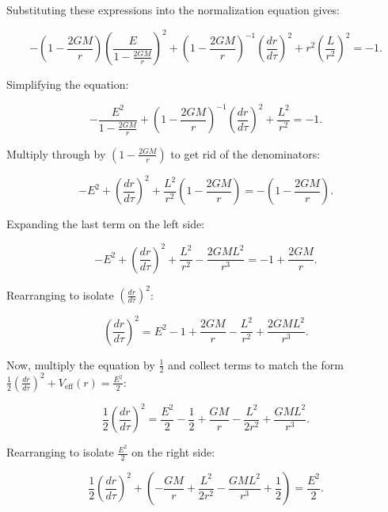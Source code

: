 \documentclass{article}
\begin{document}
Substituting these expressions into the normalization equation gives:

\begin{equation*}
-\left(1 - \frac{2GM}{r}\right) \left( \frac{E}{1-\frac{2GM}{r}} \right)^2 + \left( 1- \frac{2GM}{r} \right)^{-1} \left( \frac{dr}{d\tau} \right)^2 + r^2 \left( \frac{L}{r^2} \right)^2 = -1.
\end{equation*}

Simplifying the equation:

\begin{equation*}
-\frac{E^2}{1-\frac{2GM}{r}} + \left( 1- \frac{2GM}{r} \right)^{-1} \left( \frac{dr}{d\tau} \right)^2 + \frac{L^2}{r^2} = -1.
\end{equation*}

Multiply through by $\left( 1- \frac{2GM}{r} \right)$ to get rid of the denominators:

\begin{equation*}
-E^2 + \left( \frac{dr}{d\tau} \right)^2 + \frac{L^2}{r^2}\left( 1- \frac{2GM}{r} \right) = -\left( 1 - \frac{2GM}{r} \right).
\end{equation*}

Expanding the last term on the left side:

\begin{equation*}
-E^2 + \left( \frac{dr}{d\tau} \right)^2 + \frac{L^2}{r^2} - \frac{2GML^2}{r^3} = -1 + \frac{2GM}{r}.
\end{equation*}

Rearranging to isolate $\left( \frac{dr}{d\tau} \right)^2$:

\begin{equation*}
\left( \frac{dr}{d\tau} \right)^2 = E^2 - 1 + \frac{2GM}{r} - \frac{L^2}{r^2} + \frac{2GML^2}{r^3}.
\end{equation*}

Now, multiply the equation by $\frac{1}{2}$ and collect terms to match the form $\frac{1}{2}\left(\frac{dr}{d\tau}\right)^2 + V_{\mathrm{eff}}(r) = \frac{E^2}{2}$:

\begin{equation*}
\frac{1}{2}\left(\frac{dr}{d\tau}\right)^2 = \frac{E^2}{2} - \frac{1}{2} + \frac{GM}{r} - \frac{L^2}{2r^2} + \frac{GML^2}{r^3}.
\end{equation*}

Rearranging to isolate $\frac{E^2}{2}$ on the right side:

\begin{equation*}
\frac{1}{2}\left(\frac{dr}{d\tau}\right)^2 + \left(-\frac{GM}{r} + \frac{L^2}{2r^2} - \frac{GML^2}{r^3} + \frac{1}{2} \right) = \frac{E^2}{2}.
\end{equation*}
\end{document}
